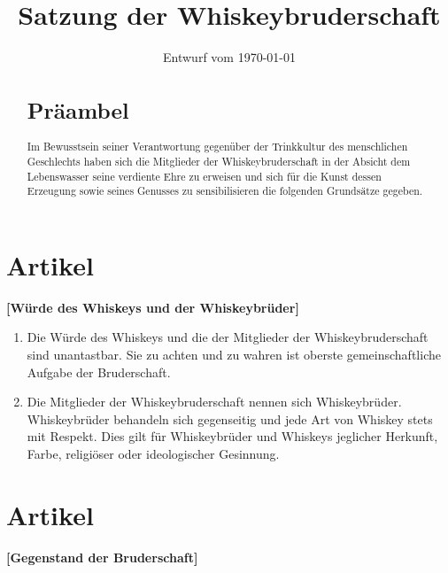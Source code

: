 \documentclass[a4paper,12pt]{scrartcl}
\title{Satzung der Whiskeybruderschaft}
\date{Entwurf vom \today}
\begin{document}
\maketitle

\clearpage

\vspace*{\fill}

\begin{abstract}
\section*{Präambel}
Im Bewusstsein seiner Verantwortung gegenüber der Trinkkultur des menschlichen Geschlechts haben
sich die Mitglieder der Whiskeybruderschaft in der Absicht dem Lebenswasser seine verdiente Ehre zu
erweisen und sich für die Kunst dessen Erzeugung sowie seines Genusses zu sensibilisieren die
folgenden Grundsätze gegeben.
\end{abstract}

\vspace*{\fill}
%
\clearpage


\section{Artikel \thesection}
\label{sec:würde}
\textbf{[Würde des Whiskeys und der Whiskeybrüder]}

\begin{enumerate}

\item Die Würde des Whiskeys und die der Mitglieder der Whiskeybruderschaft sind unantastbar. Sie zu
  achten und zu wahren ist oberste gemeinschaftliche Aufgabe der Bruderschaft.

\item Die Mitglieder der Whiskeybruderschaft nennen sich Whiskeybrüder. Whiskeybrüder behandeln sich
  gegenseitig und jede Art von Whiskey stets mit Respekt. Dies gilt für Whiskeybrüder und Whiskeys
  jeglicher Herkunft, Farbe, religiöser oder ideologischer Gesinnung.

\end{enumerate}



\section{Artikel \thesection}
\label{sec:gegenstand}
\textbf{[Gegenstand der Bruderschaft]}
\end{document}
